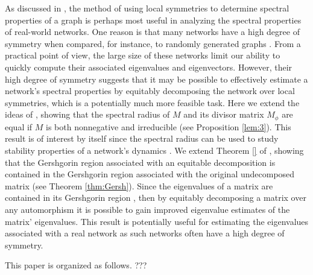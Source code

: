 \documentclass[preprint,12pt]{elsarticle}
\theoremstyle{definition}
\theoremstyle{remark}
\begin{document}
As discussed in \cite{FSSW}, the method of using local symmetries to determine spectral properties of a graph is perhaps most useful in analyzing the spectral properties of real-world networks. One reason is that many networks have a high degree of symmetry \cite{MacArthur} when compared, for instance, to randomly generated graphs \cite{Aldous2000,Newman10,Strogatz03,Watts99}. From a practical point of view, the large size of these networks limit our ability to quickly compute their associated eigenvalues and eigenvectors. However, their high degree of symmetry suggests that it may be possible to effectively estimate a network's spectral properties by equitably decomposing the network over local symmetries, which is a potentially much more feasible task.  Here we extend the ideas of \cite{FSSW}, showing that the spectral radius of $M$ and its divisor matrix $M_{\phi}$ are equal if $M$ is both nonnegative and irreducible (see Proposition \ref{lem:3}). This result is of interest by itself since the spectral radius can be used to study stability properties of a network's dynamics \cite{BW10,BW11}.  We extend Theorem \ref{} of \cite{FSSW}, showing that the Gershgorin region associated with an equitable decomposition is contained in the Gershgorin region associated with the original undecomposed matrix (see Theorem \ref{thm:Gersh}). Since the eigenvalues of a matrix are contained in its Gershgorin region \cite{Gershgorin31}, then by equitably decomposing a matrix over any automorphism it is possible to gain improved eigenvalue estimates of the matrix' eigenvalues. This result is potentially useful for estimating the eigenvalues associated with a real network {as such networks often have a high degree of symmetry.}

This paper is organized as follows.
???
%
%
%
\end{document}
